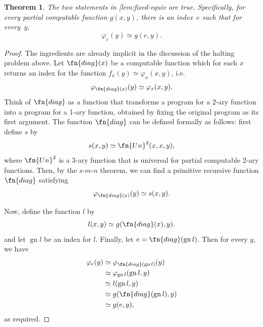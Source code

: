 \documentclass[10pt,a4paper]{article}
\makeatletter
\theoremstyle{plain}
\newtheorem{thm}{Theorem}[section]
\theoremstyle{definition}
\theoremstyle{remark}
\newcommand{\olref}{\@ifnextchar[{\olref@i}{\olref@final}}
\def\olref@i[#1]{\@ifnextchar[{\olref@ii}{\olref@final}}
\def\olref@ii[#1]{\@ifnextchar[{\olref@iii}{\olref@final}}
\def\olref@iii[#1]{\olref@final}
\def\olref@final#1{\ref{#1}}
\providecommand{\cfind}[1]{\varphi_{#1}}
\providecommand{\gn}{\operatorname{gn}}
\makeatother
\begin{document}
\begin{thm}
The two statements in \olref{lem:fixed-equiv} are
true. Specifically, for every partial computable function $g(x,y)$,
there is an index~$e$ such that for every~$y$,
\[
\cfind{e}(y) \simeq g(e,y).
\]
\end{thm}

\begin{proof}
The ingredients are already implicit in the discussion of the halting
problem above. Let $\fn{diag}(x)$ be a computable function which for each
$x$ returns an index for the function $f_x(y) \simeq \cfind{x}(x,y)$,
i.e.
\[
\cfind{\fn{diag}(x)}(y) \simeq \cfind{x}(x,y).
\]
Think of $\fn{diag}$ as a function that transforms a program for a 2-ary
function into a program for a 1-ary function, obtained by fixing the
original program as its first argument. The function $\fn{diag}$ can be
defined formally as follows: first define $s$ by
\[
s(x,y) \simeq \fn{Un}^2(x,x,y),
\]
where $\fn{Un}^2$ is a 3-ary function that is universal for partial computable
2-ary functions. Then, by the $s$-$m$-$n$ theorem, we can find a primitive
recursive function $\fn{diag}$ satisfying
\[
\cfind{\fn{diag}(x)}(y) \simeq s(x,y).
\]

Now, define the function $l$ by
\[
l(x,y) \simeq g(\fn{diag}(x),y).
\]
and let $\gn{l}$ be an index for $l$. Finally, let $e = \fn{diag}(\gn{l})$.
Then for every $y$, we have
\begin{align*}
\cfind{e}(y) & \simeq \cfind{\fn{diag}(\gn{l})}(y) \\
& \simeq \cfind{\gn{l}}(\gn{l}, y) \\
& \simeq l(\gn{l}, y) \\
& \simeq g(\fn{diag}(\gn{l}),y) \\
& \simeq g(e, y),
\end{align*}
as required.
\end{proof}
\end{document}
